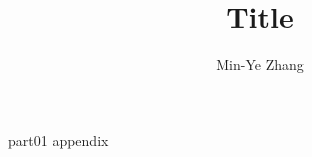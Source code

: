\documentclass[a4paper,12pt]{report}
\begin{document}
\title{Title}
\author{Min-Ye Zhang}
\maketitle
\tableofcontents
{part01}
{appendix}

\end{document}

